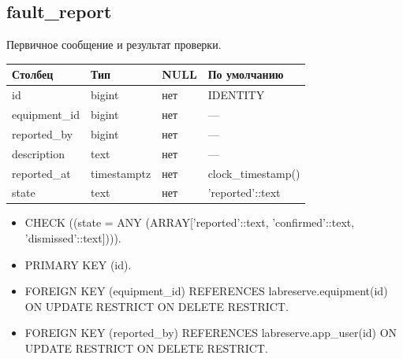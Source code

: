 \par\noindent\begin{minipage}{\linewidth}
\subsection{fault\_\allowbreak{}report}
Первичное сообщение и результат проверки.\par\smallskip\noindent
\begin{tabular}{p{}p{}p{}p{}}
\toprule Столбец & Тип & NULL & По умолчанию \\ \midrule
id & bigint & нет & IDENTITY \\
equipment\_\allowbreak{}id & bigint & нет & — \\
reported\_\allowbreak{}by & bigint & нет & — \\
description & text & нет & — \\
reported\_\allowbreak{}at & timestamptz & нет & clock\_\allowbreak{}timestamp() \\
state & text & нет & 'reported'::text \\
\bottomrule\end{tabular}\end{minipage}\par
\begin{itemize}
\item CHECK ((state = ANY (ARRAY['reported'::text, 'confirmed'::text, 'dismissed'::text]))).
\item PRIMARY KEY (id).
\item FOREIGN KEY (equipment\_\allowbreak{}id) REFERENCES labreserve.equipment(id) ON UPDATE RESTRICT ON DELETE RESTRICT.
\item FOREIGN KEY (reported\_\allowbreak{}by) REFERENCES labreserve.app\_\allowbreak{}user(id) ON UPDATE RESTRICT ON DELETE RESTRICT.
\end{itemize}
